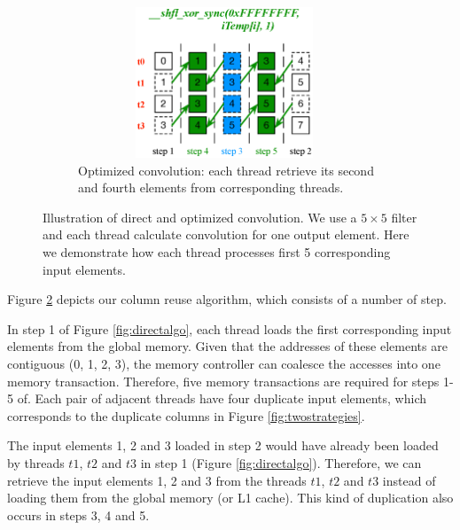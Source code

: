 \begin{figure}[t!]
\begin{subfigure}{0.3\textwidth}
		 \includegraphics[width=0.96\textwidth,height=4.5cm]{./figure/optalgo2.eps}
		 \caption{Optimized convolution: each thread retrieve its second and fourth elements from corresponding threads.}
		 \label{fig:optalgo2}
	\end{subfigure}
  \caption{Illustration of direct and optimized convolution. We use a $5 \times 5$ filter  and each thread calculate convolution for one output element. Here we demonstrate how each thread processes first 5 corresponding input elements.}
   \label{fig:corealgo}
\end{figure}



Figure \ref{fig:corealgo} depicts our column reuse algorithm, which consists of a number of step.

 In step 1 of Figure \ref{fig:directalgo}, each thread loads the first corresponding input elements from the
global memory. Given that the addresses of these elements are contiguous (0, 1, 2, 3), the memory controller can coalesce the accesses into
one memory transaction. Therefore, five memory transactions are required for steps 1-5 of. Each pair of adjacent threads have four
duplicate input elements, which corresponds to the duplicate columns in Figure \ref{fig:twostrategies}.

The input elements 1, 2 and 3 loaded in step 2 would have already been loaded by threads $t1$, $t2$ and $t3$ in step 1 (Figure
\ref{fig:directalgo}). Therefore, we can retrieve the input elements 1, 2 and 3 from the threads $t1$, $t2$ and $t3$ instead of loading
them from the global memory (or L1 cache). This kind of duplication also occurs in steps 3, 4 and 5.

